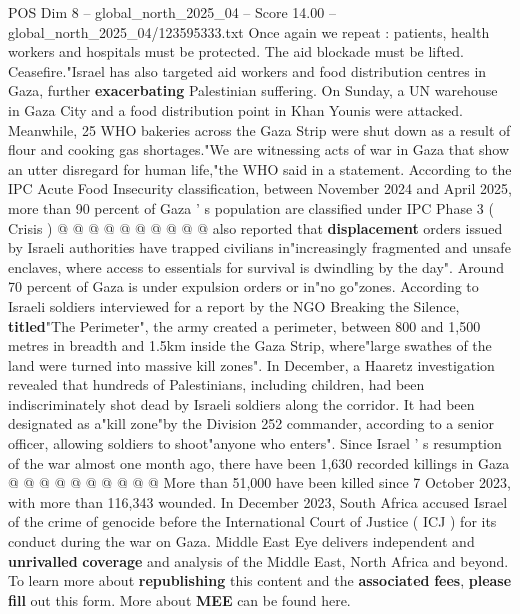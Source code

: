 \begin{textsample}{POS Dim 8 – global\_north\_2025\_04 – Score 14.00 – global\_north\_2025\_04/123595333.txt}
Once again we repeat : patients, health workers and hospitals must be protected.
The aid blockade must be lifted.
Ceasefire."Israel has also targeted aid workers and food distribution centres in Gaza, further \textbf{exacerbating} Palestinian suffering.
On Sunday, a UN warehouse in Gaza City and a food distribution point in Khan Younis were attacked.
Meanwhile, 25 WHO bakeries across the Gaza Strip were shut down as a result of flour and cooking gas shortages."We are witnessing acts of war in Gaza that show an utter disregard for human life,"the WHO said in a statement.
According to the IPC Acute Food Insecurity classification, between November 2024 and April 2025, more than 90 percent of Gaza ' s population are classified under IPC Phase 3 ( Crisis ) @ @ @ @ @ @ @ @ @ @ also reported that \textbf{displacement} orders issued by Israeli authorities have trapped civilians in"increasingly fragmented and unsafe enclaves, where access to essentials for survival is dwindling by the day".
Around 70 percent of Gaza is under expulsion orders or in"no go"zones.
According to Israeli soldiers interviewed for a report by the NGO Breaking the Silence, \textbf{titled}"The Perimeter", the army created a perimeter, between 800 and 1,500 metres in breadth and 1.5km inside the Gaza Strip, where"large swathes of the land were turned into massive kill zones".
In December, a Haaretz investigation revealed that hundreds of Palestinians, including children, had been indiscriminately shot dead by Israeli soldiers along the corridor.
It had been designated as a"kill zone"by the Division 252 commander, according to a senior officer, allowing soldiers to shoot"anyone who enters".
Since Israel ' s resumption of the war almost one month ago, there have been 1,630 recorded killings in Gaza @ @ @ @ @ @ @ @ @ @ More than 51,000 have been killed since 7 October 2023, with more than 116,343 wounded.
In December 2023, South Africa accused Israel of the crime of genocide before the International Court of Justice ( ICJ ) for its conduct during the war on Gaza.
Middle East Eye delivers independent and \textbf{unrivalled} \textbf{coverage} and analysis of the Middle East, North Africa and beyond.
To learn more about \textbf{republishing} this content and the \textbf{associated} \textbf{fees}, \textbf{please} \textbf{fill} out this form.
More about \textbf{MEE} can be found here.

\end{textsample}
